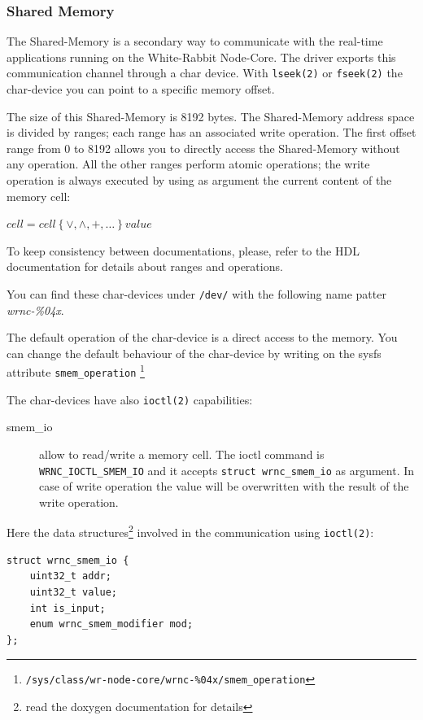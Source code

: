 \documentclass[a4paper,10pt]{article}
\begin{document}
\subsubsection{Shared Memory}%
The Shared-Memory is a secondary way to communicate with the real-time
applications running on the White-Rabbit Node-Core. The driver exports
this communication channel through a char device. With \texttt{lseek(2)}
or \texttt{fseek(2)} the char-device you can point to a specific
memory offset.

The size of this Shared-Memory is 8192 bytes. The Shared-Memory
address space is divided by ranges; each range has an associated write
operation. The first offset range from 0 to 8192 allows you to
directly access the Shared-Memory without any operation. All the other
ranges perform atomic operations; the write operation is always
executed by using as argument the current content of the memory cell:

\begin{math}
  cell = cell \left\{ \vee, \wedge, +, \dots \right\} value
\end{math}

To keep consistency between documentations, please, refer to the HDL 
documentation for details about ranges and operations.

You can find these char-devices under \texttt{/dev/} with the
following name patter \textit{wrnc-\%04x}.

The default operation of the char-device is a direct access to the 
memory. You can change the default behaviour of the char-device by 
writing on the sysfs attribute \texttt{smem\_operation}
\footnote{\texttt{/sys/class/wr-node-core/wrnc-\%04x/smem\_operation}}
 

The char-devices have also \texttt{ioctl(2)} capabilities:
\begin{description}
  \item[smem\_io] allow to read/write a memory cell. The ioctl command
    is \texttt{WRNC\_IOCTL\_SMEM\_IO} and it accepts \texttt{struct
    wrnc\_smem\_io} as argument. In case of write operation the
    value will be overwritten with the result of the write operation.
\end{description}

Here the data structures\footnote{read the doxygen documentation for 
details} involved in the communication using
\texttt{ioctl(2)}:

\begin{lstlisting}
struct wrnc_smem_io {
	uint32_t addr;
	uint32_t value;
	int is_input;
	enum wrnc_smem_modifier mod;
};
\end{lstlisting}
\end{document}
